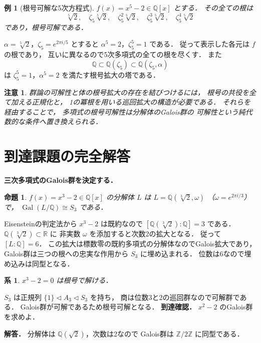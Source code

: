 \documentclass[a5paper,10pt,onecolumn]{jsarticle}
\makeatletter
\theoremstyle{mathnotetheorem}
\newtheorem{proposition}[theorem]{命題}
\newtheorem{corollary}[theorem]{系}
\newtheorem{example}[theorem]{例}
\newtheorem{remark}[theorem]{注意}
\renewcommand{\proofname}{証明}
\renewenvironment{proof}[1][\proofname]{%
  \par\pushQED{\qed}\normalfont\topsep4\p@\@plus2\p@\relax
  \trivlist\item[\hskip\labelsep\bfseries #1]\ignorespaces
}{\popQED\endtrivlist\@endpefalse}
\makeatother
\begin{document}
\begin{example}[根号可解な5次方程式]
$f(x)=x^5-2\in\mathbb Q[x]$ とする．
その全ての根は
\[
 \sqrt[5]{2},\quad\zeta_5\sqrt[5]{2},\quad
 \zeta_5^2\sqrt[5]{2},\quad
 \zeta_5^3\sqrt[5]{2},\quad
 \zeta_5^4\sqrt[5]{2}
\]
であり，根号可解である．
\end{example}
\begin{proof}
$\alpha=\sqrt[5]{2}$，$\zeta_5=e^{2\pi i/5}$ とすると
$\alpha^5=2$，$\zeta_5^5=1$ である．
従って表示した各元は $f$ の根であり，
互いに異なるので5次多項式の全ての根を尽くす．
また
\[
 \mathbb Q\subset\mathbb Q(\zeta_5)
 \subset\mathbb Q(\zeta_5,\alpha)
\]
は $\zeta_5^5=1$，$\alpha^5=2$ を満たす根号拡大の塔である．
\end{proof}

\begin{remark}
群論の可解性と体の根号拡大の存在を結びつけるには，
根号の共役を全て加える正規化と，
1の冪根を用いる巡回拡大の構造が必要である．
それらを経由することで，
多項式の根号可解性は分解体のGalois群の
可解性という純代数的な条件へ置き換えられる．
\end{remark}

\section{到達課題の完全解答}
\noindent\textbf{三次多項式のGalois群を決定する．}
\begin{proposition}
$f(x)=x^3-2\in\mathbb Q[x]$ の分解体 $L$ は
$L=\mathbb Q(\sqrt[3]2,\omega)$
（$\omega=e^{2\pi i/3}$）で，
$\operatorname{Gal}(L/\mathbb Q)\cong S_3$ である．
\end{proposition}
\begin{proof}
Eisensteinの判定法から $x^3-2$ は既約なので
$[\mathbb Q(\sqrt[3]2):\mathbb Q]=3$ である．
$\mathbb Q(\sqrt[3]2)\subset\mathbb R$ に
非実数 $\omega$ を添加すると次数2の拡大となる．
従って $[L:\mathbb Q]=6$．
この拡大は標数零の既約多項式の分解体なのでGalois拡大であり，
Galois群は三つの根への忠実な作用から $S_3$ に埋め込まれる．
位数は6なので埋め込みは同型となる．
\end{proof}
\begin{corollary}
$x^3-2=0$ は根号で解ける．
\end{corollary}
\begin{proof}
$S_3$ は正規列
$\{1\}\triangleleft A_3\triangleleft S_3$ を持ち，
商は位数3と2の巡回群なので可解群である．
Galois群が可解であるため根号可解となる．
\end{proof}
\noindent\textbf{到達確認．}
$x^2-2$ のGalois群を求めよ．
\par\noindent\textbf{解答．}
分解体は $\mathbb Q(\sqrt2)$，次数は2なので
Galois群は $\mathbb Z/2\mathbb Z$ に同型である．
\end{document}
